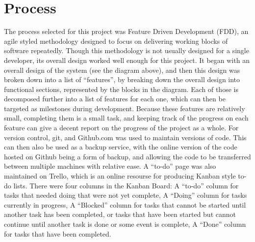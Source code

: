 \section{Process}
The process selected for this project was Feature Driven Development (FDD), an agile styled methodology designed to focus on delivering working blocks of software repeatedly. Though this methodology is not usually designed for a single developer, its overall design worked well enough for this project. It began with an overall design of the system (see the diagram above), and then this design was broken down into a list of “features”, by breaking down the overall design into functional sections, represented by the blocks in the diagram. Each of those is decomposed further into a list of features for each one, which can then be targeted as milestones during development. Because these features are relatively  small, completing them is a small task, and keeping track of the progress on each feature can give a decent report on the progress of the project as a whole.
For version control, git, and Github.com was used to maintain versions of code. This can then also be used as a backup service, with the online version of the code hosted on Github being a form of backup, and allowing the code to be transferred between multiple machines with relative ease.
A “to-do” page was also maintained on Trello, which is an online resourse for producing Kanban style to-do lists. There were four columns in the Kanban Board: 
A “to-do” column for tasks that needed doing that were not yet complete, 
A  “Doing” column for tasks currently in progress, 
A “Blocked” column for tasks that cannot be started until another task has been completed, or tasks that have been started but cannot continue until another task is done or some event is complete,
A “Done” column for tasks that have been completed.
